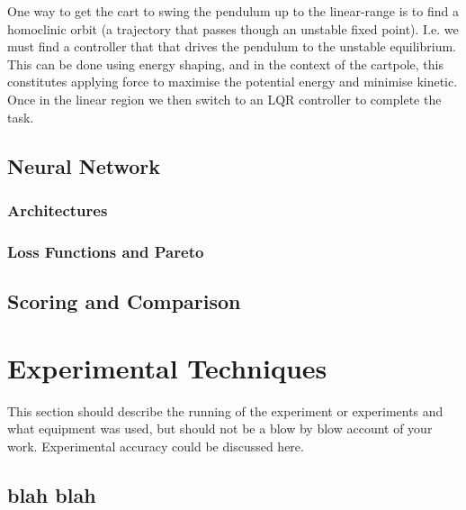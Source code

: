 \documentclass[12pt]{report}
\begin{document}
One way to get the cart to swing the pendulum up to the linear-range is to find a homoclinic orbit (a trajectory that passes though an unstable fixed point). I.e. we must find a controller that that drives the pendulum to the unstable equilibrium. This can be done using energy shaping, and in the context of the cartpole, this constitutes applying force to maximise the potential energy and minimise kinetic. Once in the linear region we then switch to an LQR controller to complete the task.

\section{Neural Network}

\subsection{Architectures}
\subsection{Loss Functions and Pareto}

\section{Scoring and Comparison}

\chapter{Experimental Techniques}
This section should describe the running of the experiment or experiments and what equipment was used, but should not be a blow by blow account of your work. Experimental accuracy could be discussed here.
\section{blah blah}
\end{document}
